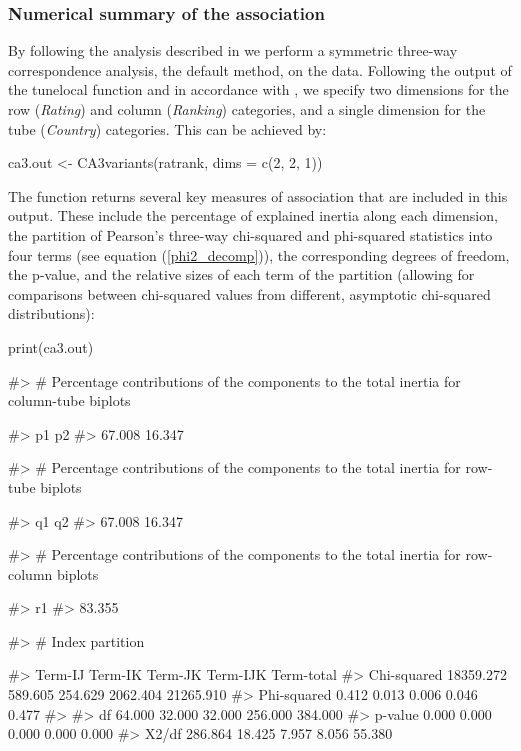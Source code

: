 \subsubsection{Numerical summary of the association}

By following the analysis described in \cite{vel07} we perform a symmetric three-way correspondence analysis, the default method, on the  data.  Following the output of the tunelocal function and in accordance with \cite{vel07}, we specify two dimensions for the row ({\it Rating}) and column ({\it Ranking}) categories, and a single dimension for the tube ({\it Country}) categories. This can be achieved by:  
\begin{example}
 ca3.out <- CA3variants(ratrank, dims = c(2, 2, 1))
\end{example}

The  function returns several key measures of association that are included in this output. These include the percentage of explained inertia along each dimension, the partition of Pearson's three-way chi-squared and phi-squared statistics into four terms (see equation (\ref{phi2_decomp})),  the corresponding degrees of freedom, the p-value, and the relative sizes of each term of the partition (allowing for comparisons between chi-squared values from different, asymptotic chi-squared distributions): 
\begin{example}
 print(ca3.out)

#> # Percentage contributions of the components to the total inertia for column-tube
biplots

#>     p1     p2 
#> 67.008 16.347 

#> # Percentage contributions of the components to the total inertia for row-tube 
biplots

#>     q1     q2 
#> 67.008 16.347 

#> # Percentage contributions of the components to the total inertia for row-column 
biplots

#>     r1 
#> 83.355 

#> #  Index partition

#>                Term-IJ Term-IK Term-JK Term-IJK Term-total
#> Chi-squared  18359.272 589.605 254.629 2062.404  21265.910
#> Phi-squared      0.412   0.013   0.006    0.046      0.477
#> %
#> df              64.000  32.000  32.000  256.000    384.000
#> p-value          0.000   0.000   0.000    0.000      0.000
#> X2/df          286.864  18.425   7.957    8.056     55.380

\end{example}


